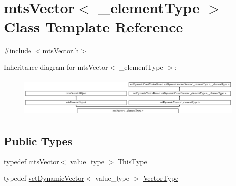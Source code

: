 \hypertarget{classmts_vector}{}\section{mts\+Vector$<$ \+\_\+element\+Type $>$ Class Template Reference}
\label{classmts_vector}


{\ttfamily \#include $<$mts\+Vector.\+h$>$}

Inheritance diagram for mts\+Vector$<$ \+\_\+element\+Type $>$\+:\begin{figure}[H]
\begin{center}
\leavevmode
\includegraphics[height=2.077922cm]{db/dc0/classmts_vector}
\end{center}
\end{figure}
\subsection*{Public Types}
\begin{DoxyCompactItemize}
\item 
typedef \hyperlink{classmts_vector}{mts\+Vector}$<$ value\+\_\+type $>$ \hyperlink{classmts_vector_a39c230cdeada331a65d94ee6790611e4}{This\+Type}
\item 
typedef \hyperlink{classvct_dynamic_vector}{vct\+Dynamic\+Vector}$<$ value\+\_\+type $>$ \hyperlink{classmts_vector_a49432bef14e2c0e3d4d9786d4e1093c7}{Vector\+Type}
\end{DoxyCompactItemize}
